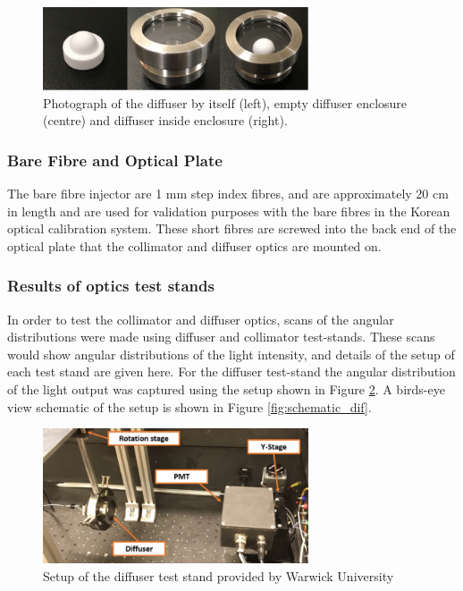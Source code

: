\begin{figure}
    \centering
    \includegraphics[width=0.7\textwidth]{Figures/diffuser_photo.png}
    \caption{Photograph of the diffuser by itself (left), empty diffuser enclosure (centre) and diffuser inside enclosure (right).}
    \label{fig:diffuser_photo}
\end{figure}

\subsubsection{Bare Fibre and Optical Plate}

The bare fibre injector are 1 mm step index fibres, and are approximately 20 cm in length and are used for validation purposes with the bare fibres in the Korean optical calibration system. These short fibres are screwed into the back end of the optical plate that the collimator and diffuser optics are mounted on.


\subsubsection{Results of optics test stands}

In order to test the collimator and diffuser optics, scans of the angular distributions were made using diffuser and collimator test-stands. These scans would show angular distributions of the light intensity, and details of the setup of each test stand are given here. For the diffuser test-stand the angular distribution of the light output was captured using the setup shown in Figure \ref{fig:diffuser_test_stand}. A birds-eye view schematic of the setup is shown in Figure \ref{fig:schematic_dif}.

\begin{figure}
    \centering
    \includegraphics[width=0.7\textwidth]{Figures/diffuser_test_stand.png}
    \caption{Setup of the diffuser test stand provided by Warwick University}
    \label{fig:diffuser_test_stand}
\end{figure}


